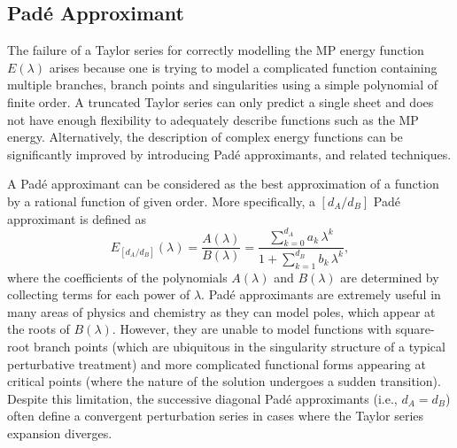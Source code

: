 \documentclass[aps,prb,reprint,noshowkeys,superscriptaddress]{revtex4-1}
\newcommand{\latin}[1]{#1}
\newcommand{\ie}{\latin{i.e.}}
\begin{document}
\subsection{Pad\'e Approximant}

The failure of a Taylor series for correctly modelling the MP energy function $E(\lambda)$ 
arises because one is trying to model a complicated function containing multiple branches, branch points and
singularities using a simple polynomial of finite order.
A truncated Taylor series can only predict a single sheet and does not have enough 
flexibility to adequately describe functions such as the MP energy.
Alternatively, the description of complex energy functions can be significantly improved
by introducing Pad\'e approximants, \cite{Pade_1892} and related techniques. \cite{BakerBook,BenderBook}

A Pad\'e approximant can be considered as the best approximation of a function by a 
rational function of given order.
More specifically, a $[d_A/d_B]$ Pad\'e approximant is defined as 
\begin{equation}
	\label{eq:PadeApp}
	E_{[d_A/d_B]}(\lambda) = \frac{A(\lambda)}{B(\lambda)} 
    = \frac{\sum_{k=0}^{d_A} a_k\, \lambda^k}{1 + \sum_{k=1}^{d_B} b_k\, \lambda^k},
\end{equation}
where the coefficients of the polynomials $A(\lambda)$ and $B(\lambda)$ are determined by collecting terms for each power of $\lambda$.
Pad\'e approximants are extremely useful in many areas of physics and 
chemistry\cite{Loos_2013,Pavlyukh_2017,Tarantino_2019,Gluzman_2020} as they can model poles, 
which appear at the roots of $B(\lambda)$. 
However, they are unable to model functions with square-root branch points 
(which are ubiquitous in the singularity structure of a typical perturbative treatment) 
and more complicated functional forms appearing at critical points 
(where the nature of the solution undergoes a sudden transition).
Despite this limitation, the successive diagonal Pad\'e approximants (\ie, $d_A = d_B $) 
often define a convergent perturbation series in cases where the Taylor series expansion diverges.
\end{document}

